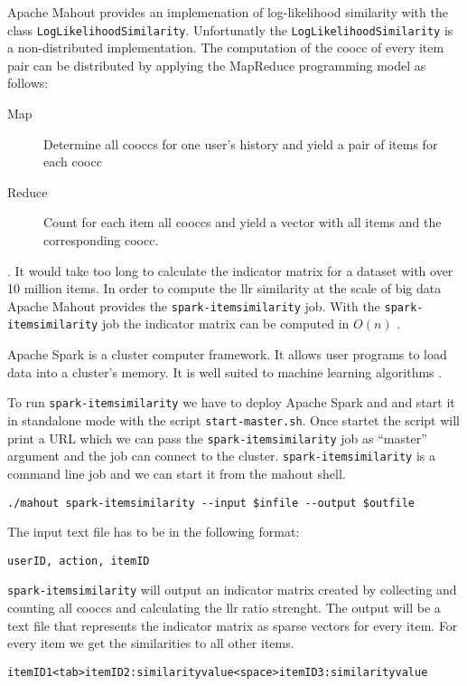 Apache Mahout provides an implemenation of log-likelihood similarity with the class \verb|LogLikelihoodSimilarity|. Unfortunatly the \verb|LogLikelihoodSimilarity| is a non-distributed implementation. The computation of the \gls{coocc} of every item pair can be distributed by applying the MapReduce programming model as follows:
\begin{description}
\item[Map] Determine all \glspl{coocc} for one user's history and yield a pair of items for each \gls{coocc}
\item[Reduce] Count for each item all \glspl{coocc} and yield a vector with all items and the corresponding \gls{coocc}.
\end{description}
. It would take too long to calculate the indicator matrix for  a dataset with over 10 million items. In order to compute the \gls{llr} similarity at the scale of big data Apache Mahout provides the \verb|spark-itemsimilarity| job. With the \verb|spark-itemsimilarity| job the indicator matrix can be computed in $O(n)$ \cite{Schelter}. 

Apache Spark is a cluster computer framework. It allows user programs to load data into a cluster's memory. It is well suited to machine learning algorithms \cite{Karau}.

To run \verb|spark-itemsimilarity| we have to deploy Apache Spark and and start it in standalone mode with the script \verb|start-master.sh|. Once startet the script will print a URL which we can pass the \verb|spark-itemsimilarity| job as ``master'' argument and the job can connect to the cluster. \verb|spark-itemsimilarity| is a command line job and we can start it from the mahout shell.

\begin{verbatim}
./mahout spark-itemsimilarity --input $infile --output $outfile
\end{verbatim}

The input text file has to be in the following format:
\begin{verbatim}
userID, action, itemID
\end{verbatim}
\verb|spark-itemsimilarity| will output an indicator matrix created by collecting and counting all \glspl{coocc} and calculating the \gls{llr} ratio strenght. The output will be a text file that represents the indicator matrix as sparse vectors for every item. For every item we get the similarities to all other items.
\begin{verbatim}
itemID1<tab>itemID2:similarityvalue<space>itemID3:similarityvalue
\end{verbatim}

